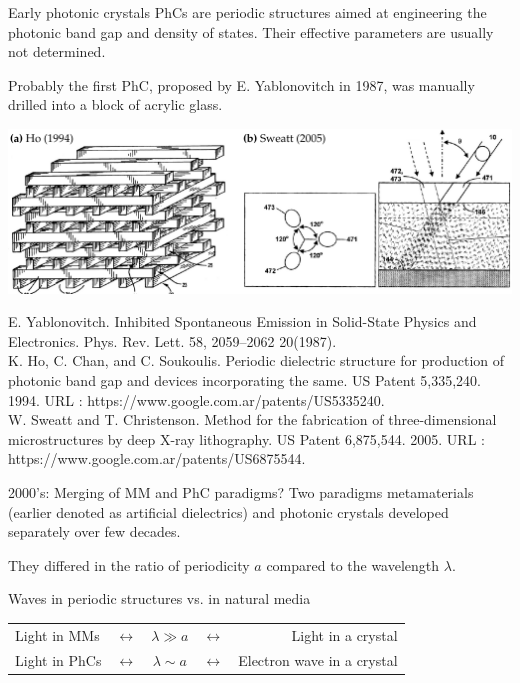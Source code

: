\documentclass[t]{beamer} \usepackage[english]{babel} \usepackage[utf8]{inputenc} \usetheme{Frankfurt} %
\begin{document}
	\begin{frame}{Early photonic crystals} 		%
PhCs are periodic structures aimed at engineering the photonic band gap and density of states. 
Their effective parameters are usually not determined.

Probably the first PhC, proposed by E. Yablonovitch in 1987, was manually drilled into a block of acrylic glass.

\vfill
\includegraphics[width=\textwidth]{../img/patents/phc_patents.pdf} 
\vfill

\tiny{E. Yablonovitch. Inhibited Spontaneous Emission in Solid-State Physics and Electronics. Phys. Rev. Lett. 58, 2059–2062 20(1987).\\
K. Ho, C. Chan, and C. Soukoulis. Periodic dielectric structure for production of photonic band gap and devices incorporating the same. US Patent 5,335,240. 1994.  URL : https://www.google.com.ar/patents/US5335240.\\
W. Sweatt and T. Christenson. Method for the fabrication of three-dimensional microstructures by deep X-ray lithography. US Patent 6,875,544. 2005. URL : https://www.google.com.ar/patents/US6875544.  }
\end{frame} 		%

\begin{frame}{2000's: Merging of MM and PhC paradigms?} 		%
Two paradigms metamaterials (earlier denoted as artificial dielectrics) and photonic crystals developed separately over few decades.

They differed in the ratio of periodicity $a$ compared to the wavelength $\lambda$. 

\begin{exampleblock}{Waves in periodic structures vs. in natural media}
\centering \begin{tabular}{lcccr}
Light in MMs    &$\leftrightarrow$  &$\lambda \gg a$ &$\leftrightarrow$ 	& Light in a crystal         	\\
Light in PhCs   &$\leftrightarrow$  &$\lambda \sim a$ &$\leftrightarrow$ 	& Electron wave in a crystal 	\\
\end{tabular}
\end{exampleblock}

\end{frame} 		%
\end{document}
